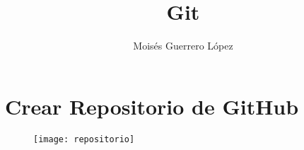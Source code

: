 \documentclass{article}
\title{Git}
\author{ Moisés Guerrero López}
\date{}
\begin{document}
\maketitle
\thispagestyle{empty}

	\section{Crear Repositorio de GitHub}
	\begin{figure}[h]
		\centering
		\texttt{[image: repositorio]}
	\end{figure}
	
	
	
	
\end{document}
